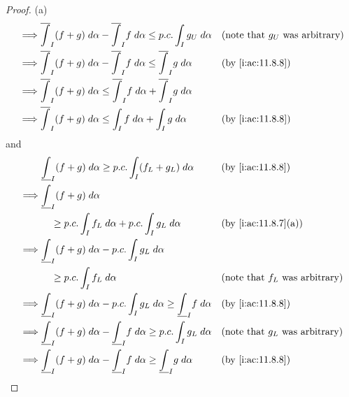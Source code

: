 \begin{proof}{(a)}
\begin{align*}
    \implies & \overline{\int}_I (f + g) \; d \alpha - \overline{\int}_I f \; d \alpha \leq p.c. \int_I g_U \; d \alpha     &   & \text{(note that \(g_U\) was arbitrary)} \\
    \implies & \overline{\int}_I (f + g) \; d \alpha - \overline{\int}_I f \; d \alpha \leq \overline{\int}_I g \; d \alpha &   & \by{i:ac:11.8.8}                         \\
    \implies & \overline{\int}_I (f + g) \; d \alpha \leq \overline{\int}_I f \; d \alpha + \overline{\int}_I g \; d \alpha &                                              \\
    \implies & \overline{\int}_I (f + g) \; d \alpha \leq \int_I f \; d \alpha + \int_I g \; d \alpha                       &   & \by{i:ac:11.8.8}
  \end{align*}
  and
  \begin{align*}
             & \underline{\int}_I (f + g) \; d \alpha \geq p.c. \int_I (f_L + g_L) \; d \alpha                                 &   & \by{i:ac:11.8.8}                         \\
    \implies & \underline{\int}_I (f + g) \; d \alpha                                                                                                                         \\
             & \quad \geq p.c. \int_I f_L \; d \alpha + p.c. \int_I g_L \; d \alpha                                            &   & \by{i:ac:11.8.7}[a]                      \\
    \implies & \underline{\int}_I (f + g) \; d \alpha - p.c. \int_I g_L \; d \alpha                                                                                           \\
             & \quad \geq p.c. \int_I f_L \; d \alpha                                                                          &   & \text{(note that \(f_L\) was arbitrary)} \\
    \implies & \underline{\int}_I (f + g) \; d \alpha - p.c. \int_I g_L \; d \alpha \geq \underline{\int}_I f \; d \alpha      &   & \by{i:ac:11.8.8}                         \\
    \implies & \underline{\int}_I (f + g) \; d \alpha - \underline{\int}_I f \; d \alpha \geq p.c. \int_I g_L \; d \alpha      &   & \text{(note that \(g_L\) was arbitrary)} \\
    \implies & \underline{\int}_I (f + g) \; d \alpha - \underline{\int}_I f \; d \alpha \geq \underline{\int}_I g \; d \alpha &   & \by{i:ac:11.8.8}                         \\

\end{align*}
\end{proof}
